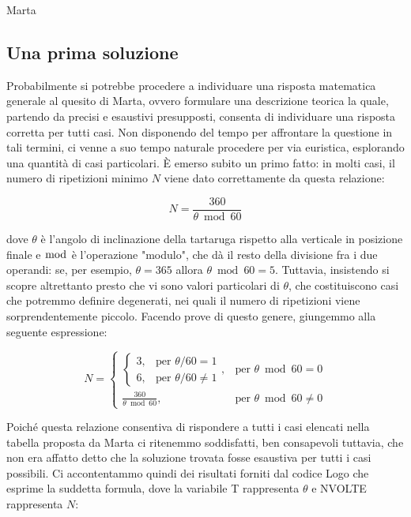 \vskip 0.3cm

Marta


\subsection{Una prima soluzione}


Probabilmente si potrebbe procedere a individuare una risposta matematica
generale al quesito di Marta, ovvero formulare una descrizione teorica la
quale, partendo da precisi e esaustivi presupposti, consenta di individuare una
risposta corretta per tutti casi. Non disponendo del tempo per affrontare la
questione in tali termini, ci venne a suo tempo naturale procedere per via
euristica, esplorando una quantità di casi particolari. È emerso subito un
primo fatto: in molti casi, il numero di ripetizioni minimo $N$ viene dato
correttamente da questa relazione:

\begin{equation}
N=\frac{360}{\theta \bmod 60}
\end{equation} 

dove $\theta$ è l'angolo di inclinazione della tartaruga rispetto alla
verticale in posizione finale e $\bmod$ è l'operazione "modulo", che dà il
resto della divisione fra i due operandi: se, per esempio, $\theta=365$ allora
$\theta \bmod 60 = 5$. Tuttavia, insistendo si scopre altrettanto presto che vi
sono valori particolari di $\theta$, che costituiscono casi che potremmo
definire degenerati, nei quali il numero di ripetizioni viene sorprendentemente
piccolo. Facendo prove di questo genere, giungemmo alla seguente espressione:

\begin{equation} \label{eq:1}
N=
\begin{cases}
\begin{cases}
3, & \text{per } \theta/60=1 \\
6, & \text{per } \theta/60 \ne 1
\end{cases}, & \text{per } \theta \bmod 60 = 0  \\
\frac{360}{\theta \bmod 60}, & \text{per } \theta \bmod 60 \neq 0
\end{cases}
\end{equation}

Poiché questa relazione consentiva di rispondere a tutti i casi elencati nella
tabella proposta da Marta ci ritenemmo soddisfatti, ben consapevoli tuttavia,
che non era affatto detto che la soluzione trovata fosse esaustiva per tutti i
casi possibili. Ci accontentammo quindi dei risultati forniti dal codice Logo
che esprime la suddetta formula, dove la variabile T rappresenta $\theta$ e
NVOLTE rappresenta $N$:

